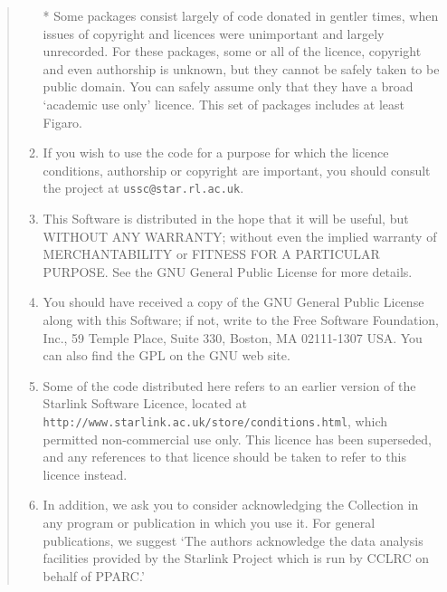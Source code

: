 \documentclass[twoside,11pt]{article}
\newcommand{\htmladdnormallink}[2]{#1}
\renewcommand{\_}{\texttt{\symbol{95}}}
\begin{document}
\begin{quote}
\begin{enumerate}
  * Some packages consist largely of code donated in gentler times,
    when issues of copyright and licences were unimportant and
    largely unrecorded.  For these packages, some or all of the
    licence, copyright and even authorship is unknown, but they
    cannot be safely taken to be public domain.  You can safely
    assume only that they have a broad `academic use only' licence.
    This set of packages includes at least Figaro.

\item If you wish to use the code for a purpose for which the licence
 conditions, authorship or copyright are important, you should
 consult the project at \texttt{ussc@star.rl.ac.uk}.

\item This Software is distributed in the hope that it will be useful, but
 WITHOUT ANY WARRANTY; without even the implied warranty of
 MERCHANTABILITY or FITNESS FOR A PARTICULAR PURPOSE. See the GNU General
 Public License for more details.

\item You should have received a copy of the GNU General Public License along
 with this Software; if not, write to the Free Software Foundation, Inc.,
 59 Temple Place, Suite 330, Boston, MA 02111-1307 USA. You can also find
 the GPL on the GNU web site.

\item Some of the code distributed here refers to an earlier version of
 the Starlink Software Licence, located at
 \htmladdnormallink{\texttt{http://www.starlink.ac.uk/store/conditions.html}}{http://www.starlink.ac.uk/store/conditions.html},
 which permitted non-commercial use only.  This licence has been
 superseded, and any references to that licence should be taken to
 refer to this licence instead.

\item In addition, we ask you to consider acknowledging the Collection in any
 program or publication in which you use it.  For general publications,
 we suggest `The authors acknowledge the data analysis facilities
 provided by the Starlink Project which is run by CCLRC on behalf
 of PPARC.'
\end{enumerate}
\end{quote}
\end{document}
